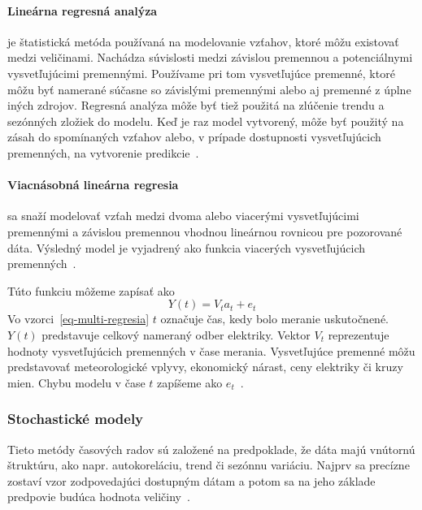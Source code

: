 \documentclass[a4paper,slovak,12pt,appendix]{article}
\begin{document}
\paragraph{Lineárna regresná analýza} je štatistická metóda používaná na
modelovanie vzťahov, ktoré môžu existovať medzi veličinami. Nachádza súvislosti
medzi závislou premennou a potenciálnymi vysvetľujúcimi premennými. Používame
pri tom vysvetľujúce premenné, ktoré môžu byť namerané súčasne so závislými
premennými alebo aj premenné z úplne iných zdrojov. Regresná analýza môže byť
tiež použitá na zlúčenie trendu a sezónných zložiek do modelu. Keď je raz model
vytvorený, môže byť použitý na zásah do spomínaných vzťahov alebo, v prípade
dostupnosti vysvetľujúcich premenných, na vytvorenie predikcie~\cite{Liu1992}.

\paragraph{Viacnásobná lineárna regresia} sa snaží modelovať vzťah medzi dvoma
alebo viacerými vysvetľujúcimi premennými a závislou premennou vhodnou
lineárnou rovnicou pre pozorované dáta. Výsledný model je vyjadrený ako funkcia
viacerých vysvetľujúcich premenných~\cite{Grmanova2016}.

Túto funkciu môžeme zapísať ako
\begin{equation}
  Y(t) = V_t a_t + e_t
  \label{eq-multi-regresia}
\end{equation}
Vo vzorci~\ref{eq-multi-regresia} $t$ označuje čas, kedy bolo meranie
uskutočnené. $Y(t)$ predstavuje celkový nameraný odber elektriky. Vektor $V_t$
reprezentuje hodnoty vysvetľujúcich premenných v čase merania. Vysvetľujúce
premenné môžu predstavovať meteorologické vplyvy, ekonomický nárast, ceny
elektriky či kruzy mien. Chybu modelu v čase $t$ zapíšeme
ako $e_t$~\cite{KumarSingh2013, Mahalakshmi2016}.


\subsubsection{Stochastické modely}
Tieto metódy časových radov sú založené na predpoklade, že dáta majú vnútornú
štruktúru, ako napr. autokoreláciu, trend či sezónnu variáciu. Najprv sa
precízne zostaví vzor zodpovedajúci dostupným dátam a potom sa na jeho základe
predpovie budúca hodnota veličiny~\cite{KumarSingh2013}.
\end{document}
